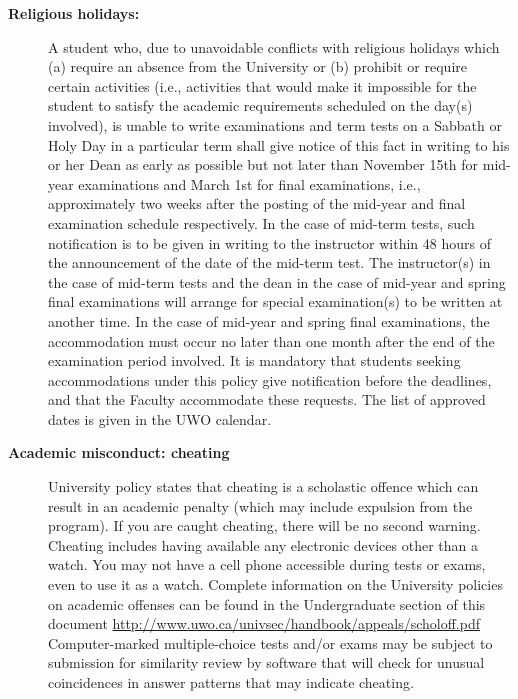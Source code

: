 \documentclass[12pt]{article}
\begin{document}
\begin{description}
\item[\bf Religious holidays:] A student who, due to unavoidable conflicts with religious holidays which (a) require an absence from the University or (b) prohibit or require certain activities (i.e., activities that would make it impossible for the student to satisfy the academic requirements scheduled on the day(s) involved), is unable to write examinations and term tests on a Sabbath or Holy Day in a particular term shall give notice of this fact in writing to his or her Dean as early as possible but not later than November 15th for mid-year examinations and March 1st for final examinations, i.e., approximately two weeks after the posting of the mid-year and final examination schedule respectively. In the case of mid-term tests, such notification is to be given in writing to the instructor within 48 hours of the announcement of the date of the mid-term test. The instructor(s) in the case of mid-term tests and the dean in the case of mid-year and spring final examinations will arrange for special examination(s) to be written at another time. In the case of mid-year and spring final examinations, the accommodation must occur no later than one month after the end of the examination period involved. It is mandatory that students seeking accommodations under this policy give notification before the deadlines, and that the Faculty accommodate these requests. The list of approved dates is given in the UWO calendar.

\item[\bf Academic misconduct: cheating] University policy states that cheating is a scholastic offence which can result in an academic penalty (which may include expulsion from the program). If you are caught cheating, there will be no second warning. Cheating includes having available any electronic devices other than a watch. You may not have a cell phone accessible during tests or exams, even to use it as a watch. Complete information on the University policies on academic offenses can be found in the Undergraduate section of this document \url{http://www.uwo.ca/univsec/handbook/appeals/scholoff.pdf}
Computer-marked multiple-choice tests and/or exams may be subject to submission for similarity review by software that will check for unusual coincidences in answer patterns that may indicate cheating.


\end{description}
\end{document}
